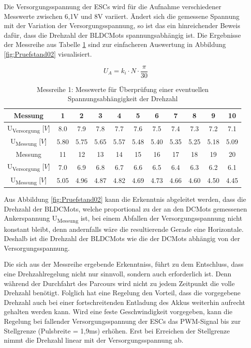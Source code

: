 Die Versorgungsspannung der \acp{ESC} wird für die Aufnahme verschiedener Messwerte zwischen 6,1V und 8V variiert. Ändert sich die gemessene Spannung mit der Variation der Versorgungsspannung, so ist das ein hinreichender Beweis dafür, dass die Drehzahl der \acp{BLDCMot} spannungsabhängig ist. Die Ergebnisse der Messreihe aus Tabelle \ref{tab:PruefstandMess01} sind zur einfacheren Auswertung in Abbildung \ref{fig:Pruefstand02} visualisiert.

\begin{equation}\label{eq4.1}
U_A = k_i \cdot N \cdot \frac{\pi}{30}
\end{equation}

\begin{table}[H]
\begin{tabular}{|c|c|c|c|c|c|c|c|c|c|c|}
\hline
\rule{0pt}{15pt} Messung & 1&2&3&4&5&6&7&8&9&10 \\
\hline
U\textsubscript{Versorgung} [$V$]&8.0&7.9&7.8&7.7&7.6&7.5&7.4&7.3&7.2&7.1 \\ 
\hline
U\textsubscript{Messung} [$V$]&5.80&5.75&5.65&5.57&5.48&5.40&5.35&5.25&5.18&5.09 \\
\hline
\hline
\rule{0pt}{15pt} Messung & 11&12&13&14&15&16&17&18&19&20 \\
\hline
U\textsubscript{Versorgung} [$V$]&7.0&6.9&6.8&6.7&6.6&6.5&6.4&6.3&6.2&6.1 \\ 
\hline
U\textsubscript{Messung} [$V$]&5.05&4.96&4.87&4.82&4.69&4.73&4.66&4.60&4.50&4.45 \\
\hline
\end{tabular}
\centering
\captionsetup{width=.95\textwidth}
\caption[Messreihe 1: Spannungsabhängigkeit Drehzahl]{Messreihe 1: Messwerte für Überprüfung einer eventuellen Spannungsabhängigkeit der Drehzahl}\centering
\label{tab:PruefstandMess01}
\end{table}

Aus Abbildung \ref{fig:Pruefstand02} kann die Erkenntnis abgeleitet werden, dass die Drehzahl der \acp{BLDCMot}, welche proportional zu der an den \acp{DCMot} gemessenen Ankerspannung U\textsubscript{Messung} ist, bei einem Abfallen der Versorgungsspannung nicht konstant bleibt, denn andernfalls wäre die resultierende Gerade eine Horizontale. Deshalb ist die Drehzahl der \acp{BLDCMot} wie die der \acp{DCMot} abhängig von der Versorgungsspannung.\vspace{11pt}

Die sich aus der Messreihe ergebende Erkenntniss, führt zu dem Entschluss, dass eine Drehzahlregelung nicht nur sinnvoll, sondern auch erforderlich ist. Denn während der Durchfahrt des Parcours wird nicht zu jedem Zeitpunkt die volle Drehzahl benötigt. Folglich hat eine Regelung den Vorteil, dass die vorgegebene Drehzahl auch bei einer fortschreitenden Entladung des Akkus weiterhin aufrecht gehalten werden kann. Wird eine feste Geschwindigkeit vorgegeben, kann die Regelung bei fallender Versorgungsspannung der \acp{ESC} das \ac{PWM}-Signal bis zur Stellgrenze (Pulsbreite = 1,9ms) erhöhen. Erst bei Erreichen der Stellgrenze nimmt die Drehzahl linear mit der Versorgungsspannung ab.

